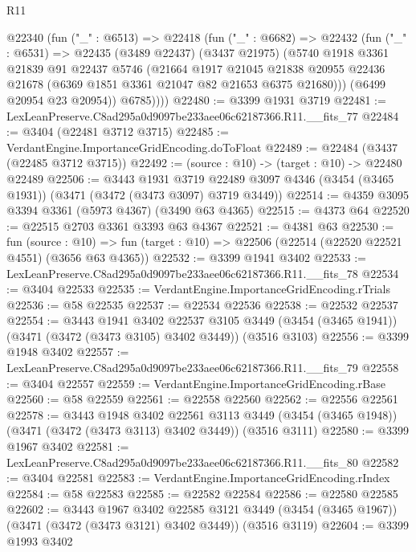 \begin{lexlean}{R11}
\begin{coremodule}
      @22340
        (fun ("_" : @6513) =>
        @22418
          (fun ("_" : @6682) =>
          @22432
            (fun ("_" : @6531) =>
            @22435
              (@3489 @22437)
              (@3437 @21975)
              (@5740
                @1918
                @3361
                @21839
                @91
                @22437
                @5746
                (@21664
                  @1917
                  @21045
                  @21838
                  @20955
                  @22436
                  @21678
                  (@6369 @1851 @3361 @21047 @82 @21653 @6375 @21680)))
              (@6499 @20954 @23 @20954))
            @6785))))
@22480 := @3399 @1931 @3719
@22481 := LexLeanPreserve.C8ad295a0d9097be233aee06c62187366.R11.__fits_77
@22484 := @3404 (@22481 @3712 @3715)
@22485 := VerdantEngine.ImportanceGridEncoding.doToFloat
@22489 := @22484 (@3437 (@22485 @3712 @3715))
@22492 := (source : @10) -> (target : @10) -> @22480 @22489
@22506 := @3443
    @1931
    @3719
    @22489
    @3097
    @4346
    (@3454 (@3465 @1931))
    (@3471 (@3472 (@3473 @3097) @3719 @3449))
@22514 := @4359 @3095 @3394 @3361 (@5973 @4367) (@3490 @63 @4365)
@22515 := @4373 @64
@22520 := @22515 @2703 @3361 @3393 @63 @4367
@22521 := @4381 @63
@22530 := fun (source : @10) =>
  fun (target : @10) => @22506 (@22514 (@22520 @22521 @4551) (@3656 @63 @4365))
@22532 := @3399 @1941 @3402
@22533 := LexLeanPreserve.C8ad295a0d9097be233aee06c62187366.R11.__fits_78
@22534 := @3404 @22533
@22535 := VerdantEngine.ImportanceGridEncoding.rTrials
@22536 := @58 @22535
@22537 := @22534 @22536
@22538 := @22532 @22537
@22554 := @3443
    @1941
    @3402
    @22537
    @3105
    @3449
    (@3454 (@3465 @1941))
    (@3471 (@3472 (@3473 @3105) @3402 @3449))
    (@3516 @3103)
@22556 := @3399 @1948 @3402
@22557 := LexLeanPreserve.C8ad295a0d9097be233aee06c62187366.R11.__fits_79
@22558 := @3404 @22557
@22559 := VerdantEngine.ImportanceGridEncoding.rBase
@22560 := @58 @22559
@22561 := @22558 @22560
@22562 := @22556 @22561
@22578 := @3443
    @1948
    @3402
    @22561
    @3113
    @3449
    (@3454 (@3465 @1948))
    (@3471 (@3472 (@3473 @3113) @3402 @3449))
    (@3516 @3111)
@22580 := @3399 @1967 @3402
@22581 := LexLeanPreserve.C8ad295a0d9097be233aee06c62187366.R11.__fits_80
@22582 := @3404 @22581
@22583 := VerdantEngine.ImportanceGridEncoding.rIndex
@22584 := @58 @22583
@22585 := @22582 @22584
@22586 := @22580 @22585
@22602 := @3443
    @1967
    @3402
    @22585
    @3121
    @3449
    (@3454 (@3465 @1967))
    (@3471 (@3472 (@3473 @3121) @3402 @3449))
    (@3516 @3119)
@22604 := @3399 @1993 @3402

\end{coremodule}
\end{lexlean}
